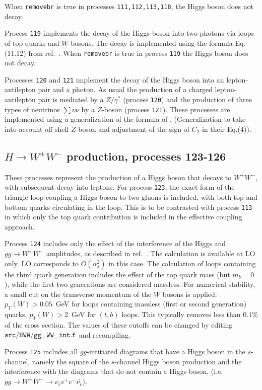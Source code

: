 \documentclass[12pt]{article}
\begin{document}
When {\tt removebr} is true in processes {\tt 111,112,113,118},
the Higgs boson does not decay.

Process {\tt 119} implements the decay of the Higgs boson into two photons
via loops of top quarks and $W$-bosons.
The decay is implemented using the formula Eq.(11.12) from ref.~\cite{Ellis:1991qj}.
When {\tt removebr} is true in process {\tt 119} the Higgs boson does not decay.

Processes {\tt 120} and {\tt 121} implement the decay of the Higgs boson into an lepton-antilepton
pair and a photon. As usual the production of a charged lepton-antilepton pair is mediated by a 
$Z/\gamma^*$ (process {\tt 120}) and the production of three types of neutrinos 
$\sum  \nu \bar{\nu}$ by a $Z$-boson (process {\tt 121}). These processes are implemented 
using a generalization of the formula of \cite{Djouadi:1996yq}. (Generalization to take into
account off-shell $Z$-boson and adjustment of the sign of $C_2$ in their Eq.(4)).


\subsection{$H \to W^+W^-$ production, processes 123-126}
These processes represent the production of a Higgs boson that decays to $W^+ W^-$,
with subsequent decay into leptons. For process {\tt 123}, the exact form of the triangle
loop coupling a Higgs boson to two gluons is included, with both top and bottom quarks
circulating in the loop. This is to be contrasted with process {\tt 113} in which only the
top quark contribution is included in the effective coupling approach.

Process {\tt 124} includes only the effect of the interference of the
Higgs and $gg \to W^+W^-$ amplitudes, as described in ref.~\cite{Campbell:2011cu}.
The calculation is available at LO only. LO corresponds to $O(\alpha_s^2)$ in this case.
The calculation of loops containing the third quark generation
includes the effect of the top quark mass (but $m_b=0$), while the first two
generations are considered massless. For numerical stability, a small cut on the
transverse momentum of the $W$ bosons is applied: $p_T(W)>0.05$~GeV for loops
containing massless (first or second generation) quarks, $p_T(W)>2$~GeV for $(t,b)$
loops. This typically removes less than $0.1$\% of the cross section. The
values of these cutoffs can be changed by editing ${\tt src/HWW/gg\_WW\_int.f}$ and recompiling.

Process {\tt 125} includes all $gg$-intitiated diagrams that have a Higgs boson in the $s$-channel,
namely the square of the $s$-channel Higgs boson production and the interference with the diagrams
that do not contain a Higgs boson, (i.e. $gg \to W^+W^- \to \nu_e e^+ e^- \bar{\nu_e}$).
\end{document}
